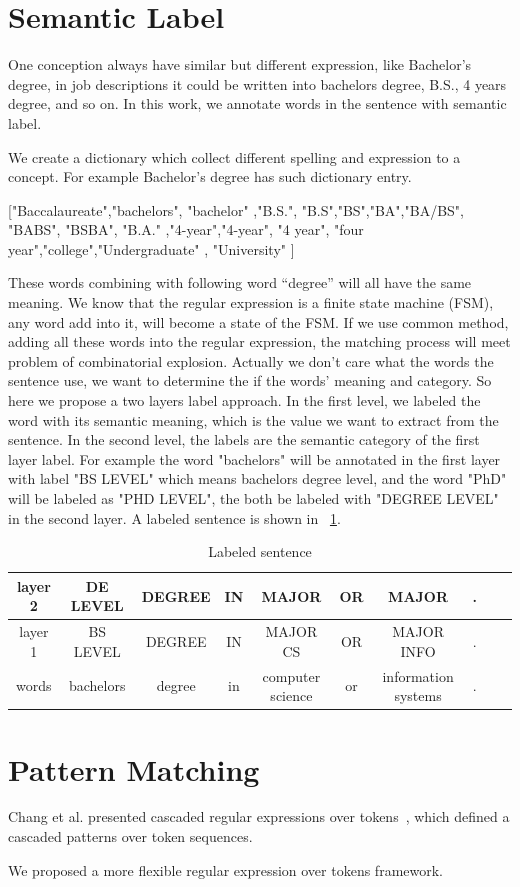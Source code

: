 \section{Semantic Label}

One conception always have similar but different expression, like Bachelor's degree, in job descriptions it could be written into bachelors degree, B.S., 4 years degree, and so on. In this work, we annotate words in the sentence with semantic label.

We create a dictionary which collect different spelling and expression to a concept. For example  Bachelor's degree has such dictionary entry.

["Baccalaureate","bachelors", "bachelor" ,"B.S.", "B.S","BS","BA","BA/BS", "BABS", "BSBA", "B.A." ,"4-year","4-year", "4 year", "four year","college","Undergraduate" , "University" ]

These words combining with following word ``degree'' will all have the same meaning. We know that the regular expression is a finite state machine (FSM), any word add into it, will become a state of the FSM. If we use common method, adding all these words into the regular expression, the matching process will meet problem of combinatorial explosion. Actually we don't care what the words the sentence use, we want to determine the if the words' meaning and category. So here we propose a two layers label approach. In the first level, we labeled the word with its semantic meaning, which is the value we want to extract from the sentence. In the second level, the labels are the semantic category of the first layer label. For example the word "bachelors" will be annotated in the first layer with label "BS LEVEL" which means bachelors degree level, and the word "PhD" will be labeled as "PHD LEVEL", the both be labeled with "DEGREE LEVEL" in the second layer. A labeled sentence is shown in ~\ref{tab:labeldsent}. 

\begin{table}[ht]
\caption{Labeled sentence } %
\centering %
\begin{tabular}{  | c | c | c | c | c |c | c |c | c | c |  }
 \hline
 layer 2 & DE LEVEL   & DEGREE & IN & MAJOR            & OR & MAJOR  &.  \\
 \hline
 layer 1 &  BS LEVEL   & DEGREE & IN & MAJOR CS         & OR & MAJOR INFO & .      \\
 \hline
   words & bachelors   & degree & in & computer science & or & information systems & .     \\
  \hline
\end{tabular}
\label{tab:labeldsent} %
\end{table}

\section{Pattern Matching}

Chang et al. presented cascaded regular expressions over tokens~\cite{chang2014tokensregex}, which defined a cascaded patterns over token sequences.

We proposed a more flexible regular expression over tokens framework.
